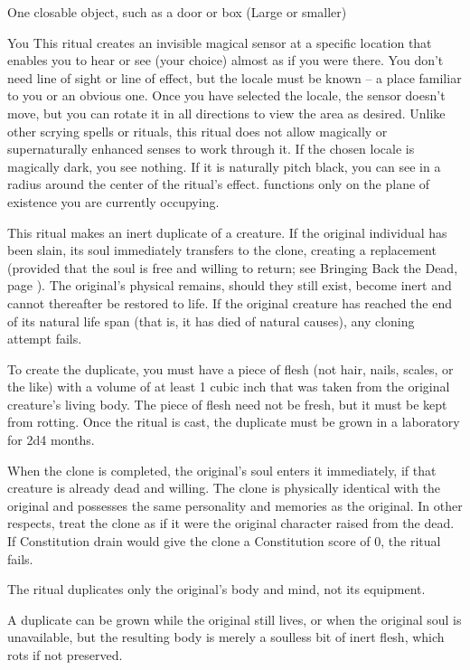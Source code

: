 \begin{spelltarget}{One closable object, such as a door or box (Large or smaller)}
\begin{spelltarget}{You}
\spelldur{\durmed \dismissable}
\spelleffect This ritual creates an invisible magical sensor at a specific location that enables you to hear or see (your choice) almost as if you were there. You don't need line of sight or line of effect, but the locale must be known -- a place familiar to you or an obvious one. Once you have selected the locale, the sensor doesn't move, but you can rotate it in all directions to view the area as desired. Unlike other scrying spells or rituals, this ritual does not allow magically or supernaturally enhanced senses to work through it. If the chosen locale is magically dark, you see nothing. If it is naturally pitch black, you can see in a \areasmall radius around the center of the ritual's effect.  functions only on the plane of existence you are currently occupying.

\spelleffect This ritual makes an inert duplicate of a creature. If the original individual has been slain, its soul immediately transfers to the clone, creating a replacement (provided that the soul is free and willing to return; see Bringing Back the Dead, page \pageref{Bringing Back the Dead}). The original's physical remains, should they still exist, become inert and cannot thereafter be restored to life. If the original creature has reached the end of its natural life span (that is, it has died of natural causes), any cloning attempt fails.
\par To create the duplicate, you must have a piece of flesh (not hair, nails, scales, or the like) with a volume of at least 1 cubic inch that was taken from the original creature's living body. The piece of flesh need not be fresh, but it must be kept from rotting. Once the ritual is cast, the duplicate must be grown in a laboratory for 2d4 months.
\par When the clone is completed, the original's soul enters it immediately, if that creature is already dead and willing. The clone is physically identical with the original and possesses the same personality and memories as the original. In other respects, treat the clone as if it were the original character raised from the dead. If Constitution drain would give the clone a Constitution score of 0, the ritual fails.
\spellnotes \par The ritual duplicates only the original's body and mind, not its equipment.
\par A duplicate can be grown while the original still lives, or when the original soul is unavailable, but the resulting body is merely a soulless bit of inert flesh, which rots if not preserved.


\end{spelltarget}
\end{spelltarget}
